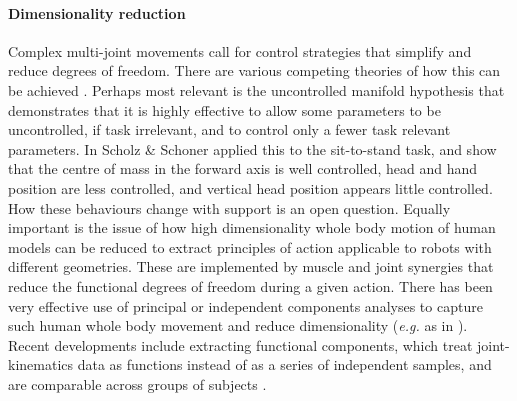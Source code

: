 \documentclass[final,5p,twocolumn]{elsarticle}
\begin{document}
\paragraph{Dimensionality reduction}
Complex multi-joint movements call for control strategies that simplify and reduce degrees of freedom. There are various competing theories of how this can be achieved \cite{Latash2010}. Perhaps most relevant is the uncontrolled manifold hypothesis \cite{Scholz1999} that demonstrates that it is highly effective to allow some parameters to be uncontrolled, if task irrelevant, and to control only a fewer task relevant parameters. In \cite{Scholz1999} Scholz \& Schoner applied this to the sit-to-stand task, and show that the centre of mass in the forward axis is well controlled, head and hand position are less controlled, and vertical head position appears little controlled. How these behaviours change with support is an open question. Equally important is the issue of how high dimensionality whole body motion of human models can be reduced to extract principles of action applicable to robots with different geometries. These are implemented by muscle and joint synergies that reduce the functional degrees of freedom during a given action. There has been very effective use of principal or independent components analyses to capture such human whole body movement and reduce dimensionality (\textit{e.g.} as in \cite{Forner-Cordero2005}). Recent developments include extracting functional components, which treat joint-kinematics data as functions instead of as a series of independent samples, and are comparable across groups of subjects \cite{Coffey2011}.
\end{document}

